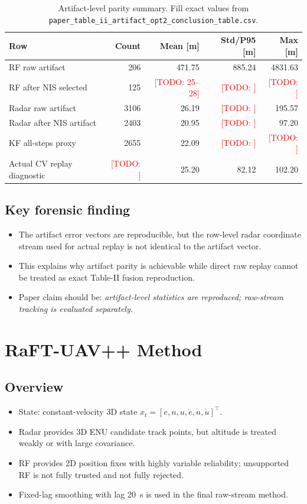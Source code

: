 \documentclass[10pt,conference]{IEEEtran}
\newcommand{\todo}[1]{\textcolor{red}{[TODO: #1]}}
\begin{document}
\begin{table}[t]
\centering
\caption{Artifact-level parity summary. Fill exact values from \texttt{paper\_table\_ii\_artifact\_opt2\_conclusion\_table.csv}.}
\label{tab:artifact_parity}
\begin{tabular}{lrrrr}
\toprule
Row & Count & Mean [m] & Std/P95 [m] & Max [m] \\
\midrule
RF raw artifact & 206 & 471.75 & 885.24 & 4831.63 \\
RF after NIS selected & 125 & \todo{25--28} & \todo{} & \todo{} \\
Radar raw artifact & 3106 & 26.19 & \todo{} & 195.57 \\
Radar after NIS artifact & 2403 & 20.95 & \todo{} & 97.20 \\
KF all-steps proxy & 2655 & 22.09 & \todo{} & \todo{} \\
Actual CV replay diagnostic & \todo{} & 25.20 & 82.12 & 102.20 \\
\bottomrule
\end{tabular}
\end{table}

\subsection{Key forensic finding}
\begin{itemize}[leftmargin=*]
  \item The artifact error vectors are reproducible, but the row-level radar coordinate stream used for actual replay is not identical to the artifact vector.
  \item This explains why artifact parity is achievable while direct raw replay cannot be treated as exact Table-II fusion reproduction.
  \item Paper claim should be: \emph{artifact-level statistics are reproduced; raw-stream tracking is evaluated separately.}
\end{itemize}

\section{RaFT-UAV++ Method}
\label{sec:method}

\subsection{Overview}
\begin{itemize}[leftmargin=*]
  \item State: constant-velocity 3D state $x_t=[e,n,u,\dot e,\dot n,\dot u]^\top$.
  \item Radar provides 3D ENU candidate track points, but altitude is treated weakly or with large covariance.
  \item RF provides 2D position fixes with highly variable reliability; unsupported RF is not fully trusted and not fully rejected.
  \item Fixed-lag smoothing with lag \SI{20}{s} is used in the final raw-stream method.
\end{itemize}
\end{document}
